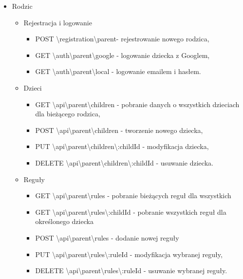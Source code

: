 \documentclass{sprawozdanie-agh}
\begin{document}
			\begin{itemize}
				\item Rodzic
				\begin{itemize}
					\item Rejestracja i logowanie
					 \begin{itemize}
						\item POST \textbackslash registration\textbackslash parent- rejestrowanie nowego rodzica,
						\item GET \textbackslash auth\textbackslash parent\textbackslash google - logowanie dziecka z Googlem,
						\item GET \textbackslash auth\textbackslash parent\textbackslash local - logowanie emailem i hasłem.		
					\end{itemize}
					\item Dzieci
					\begin{itemize}
						\item GET \textbackslash api\textbackslash parent\textbackslash children - pobranie danych o wszystkich dzieciach dla bieżącego rodzica,
						\item POST \textbackslash api\textbackslash parent\textbackslash children - tworzenie nowego dziecka,
						\item PUT \textbackslash api\textbackslash parent\textbackslash children\textbackslash :childId - modyfikacja dziecka,
						\item DELETE \textbackslash api\textbackslash parent\textbackslash children\textbackslash :childId - usuwanie dziecka.								
					\end{itemize}
					\item Reguły
					\begin{itemize}
						\item GET \textbackslash api\textbackslash parent\textbackslash rules - pobranie bieżących reguł dla wszystkich
						\item GET \textbackslash api\textbackslash parent\textbackslash rules\textbackslash :childId  - pobranie wszystkich reguł dla określonego dziecka
						\item POST \textbackslash api\textbackslash parent\textbackslash rules - dodanie nowej reguły 
						\item PUT \textbackslash api\textbackslash parent\textbackslash rules\textbackslash :ruleId - modyfikacja wybranej reguły,
						\item DELETE \textbackslash api\textbackslash parent\textbackslash rules\textbackslash :ruleId - usuwanie wybranej reguły.		

\end{itemize}
\end{itemize}
\end{itemize}
\end{document}

